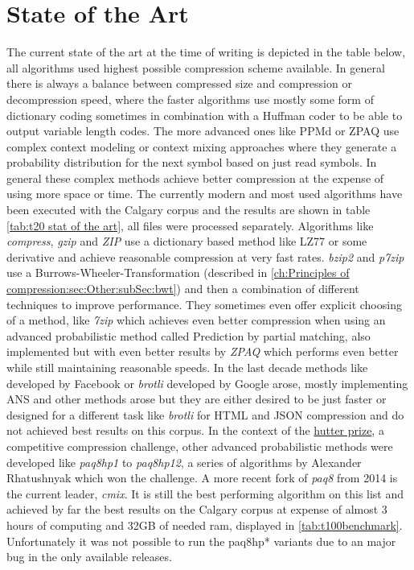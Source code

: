 \section{State of the Art}
\label{ch:Principles of compression:sec:SOTA}
\par{
The current state of the art at the time of writing is depicted in the table below, all algorithms used highest possible compression scheme available. In general there is always a balance between compressed size and compression or decompression speed, where the faster algorithms use mostly some form of dictionary coding sometimes in combination with a Huffman coder to be able to output variable length codes. The more advanced ones like PPMd or ZPAQ use complex context modeling or context mixing approaches where they generate a probability distribution for the next symbol based on just read symbols. In general these complex methods achieve better compression at the expense of using more space or time. The currently modern and most used algorithms have been executed with the Calgary corpus and the results are shown in table \ref{tab:t20 stat of the art}, all files were processed separately. Algorithms like \textit{compress}, \textit{gzip} and \textit{ZIP} use a dictionary based method like LZ77 or some derivative and achieve reasonable compression at very fast rates. \textit{bzip2} and \textit{p7zip} use a Burrows-Wheeler-Transformation (described in \ref{ch:Principles of compression:sec:Other:subSec:bwt}) and then a combination of different techniques to improve performance. They sometimes even offer explicit choosing of a method, like \textit{7zip} which achieves even better compression when using an advanced probabilistic method called Prediction by partial matching, also implemented but with even better results by \textit{ZPAQ} which performs even better while still maintaining reasonable speeds. In the last decade methods like  developed by Facebook or \textit{brotli} developed by Google arose, mostly implementing ANS and other methods arose but they are either desired to be just faster or designed for a different task like \textit{brotli} for HTML and JSON compression and do not achieved best results on this corpus. In the context of the \href{http://prize.hutter1.net/}{hutter prize}, a competitive compression challenge, other advanced probabilistic methods were developed like \textit{paq8hp1} to \textit{paq8hp12}, a series of algorithms by Alexander Rhatushnyak \cite{mahoney2011large} which won the challenge. A more recent fork of \textit{paq8} from 2014 is the current leader, \textit{cmix}. It is still the best performing algorithm on this list and achieved by far the best results on the Calgary corpus at expense of almost 3 hours of computing and 32GB of needed ram, displayed in \ref{tab:t100benchmark}. Unfortunately it was not possible to run the paq8hp* variants due to an major bug in the only available releases.
}
